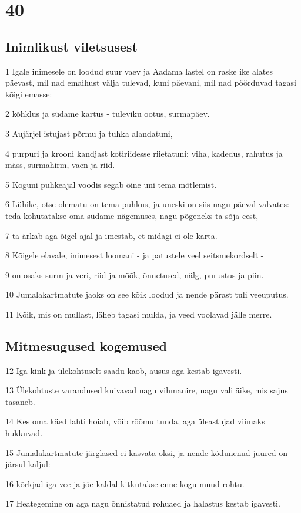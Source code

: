 \chapter{40}

\section*{Inimlikust viletsusest}

\par 1 Igale inimesele on loodud suur vaev ja Aadama lastel on raske ike alates päevast, mil nad emaihust välja tulevad, kuni päevani, mil nad pöörduvad tagasi kõigi emasse:
\par 2 kõhklus ja südame kartus - tuleviku ootus, surmapäev.
\par 3 Aujärjel istujast põrmu ja tuhka alandatuni,
\par 4 purpuri ja krooni kandjast kotiriidesse riietatuni: viha, kadedus, rahutus ja mäss, surmahirm, vaen ja riid.
\par 5 Koguni puhkeajal voodis segab öine uni tema mõtlemist.
\par 6 Lühike, otse olematu on tema puhkus, ja uneski on siis nagu päeval valvates: teda kohutatakse oma südame nägemuses, nagu põgeneks ta sõja eest,
\par 7 ta ärkab aga õigel ajal ja imestab, et midagi ei ole karta.
\par 8 Kõigele elavale, inimesest loomani - ja patustele veel seitsmekordselt -
\par 9 on osaks surm ja veri, riid ja mõõk, õnnetused, nälg, purustus ja piin.
\par 10 Jumalakartmatute jaoks on see kõik loodud ja nende pärast tuli veeuputus.
\par 11 Kõik, mis on mullast, läheb tagasi mulda, ja veed voolavad jälle merre.

\section*{Mitmesugused kogemused}

\par 12 Iga kink ja ülekohtuselt saadu kaob, ausus aga kestab igavesti.
\par 13 Ülekohtuste varandused kuivavad nagu vihmanire, nagu vali äike, mis sajus tasaneb.
\par 14 Kes oma käed lahti hoiab, võib rõõmu tunda, aga üleastujad viimaks hukkuvad.
\par 15 Jumalakartmatute järglased ei kasvata oksi, ja nende kõdunenud juured on järsul kaljul:
\par 16 kõrkjad iga vee ja jõe kaldal kitkutakse enne kogu muud rohtu.
\par 17 Heategemine on aga nagu õnnistatud rohuaed ja halastus kestab igavesti.

